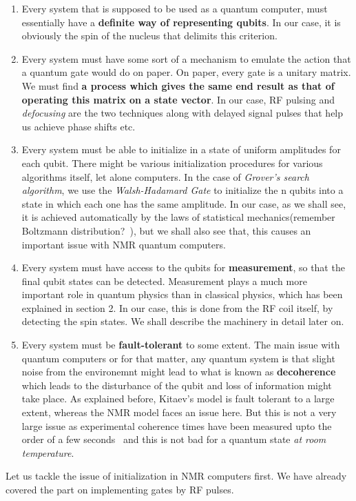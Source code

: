 \documentclass[12pt]{article}
\begin{document}
\begin{enumerate}
\item Every system that is supposed to be used as a quantum computer, must essentially have a \textbf{definite way of representing qubits}. In our case, it is obviously the spin of the nucleus that delimits this criterion.\\
\item Every system must have some sort of a mechanism to emulate the action that a quantum gate would do on paper. On paper, every gate is a unitary matrix. We must find\textbf{ a process which gives the same end result as that of operating this matrix on a state vector}. In our case, RF pulsing and \textit{defocusing} are the two techniques along with delayed signal pulses that help us achieve phase shifts etc. \\
\item Every system must be able to initialize in a state of uniform amplitudes for each qubit. There might be various initialization procedures for various algorithms itself, let alone computers. In the case of \textit{Grover's search algorithm}, we use the \textit{Walsh-Hadamard Gate} to initialize the n qubits into a state in which each one has the same amplitude. In our case, as we shall see, it is achieved automatically by the laws of statistical mechanics(remember Boltzmann distribution?~\cite{Feyn}), but we shall also see that, this causes an important issue with NMR quantum computers.\\
\item Every system must have access to the qubits for \textbf{measurement}, so that the final qubit states can be detected. Measurement plays a much more important role in quantum physics than in classical physics, which has been explained in section 2. In our case, this is done from the RF coil itself, by detecting the spin states. We shall describe the machinery in detail later on. 
\item Every system must be \textbf{fault-tolerant} to some extent. The main issue with quantum computers or for that matter, any quantum system is that slight noise from the environemnt might lead to what is known as \textbf{decoherence} which leads to the disturbance of the qubit and loss of information might take place. As explained before, Kitaev's model is fault tolerant to a large extent, whereas the NMR model faces an issue here. But this is not a very large issue as experimental coherence times have been measured upto the order of a few seconds~\cite{ethz} and this is not bad for a quantum state \textit{at room temperature}. 
\end{enumerate}
Let us tackle the issue of initialization in NMR computers first. We have already covered the part on implementing gates by RF pulses.
 


\end{document}
